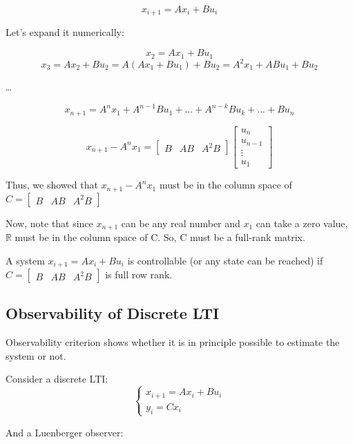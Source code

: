 \[x_{i+1} = Ax_i + Bu_i\]

Let's expand it numerically:

\[x_2 = Ax_1 + Bu_1\]
\[x_3 = Ax_2 + Bu_2 = A(Ax_1 + Bu_1) + Bu_2 = A^{2}x_1 + ABu_1 + Bu_2\]

\begin{center}
    \dots
\end{center}

\[x_{n+1} = A^{n}x_1 + A^{n-1}Bu_1 + ... + A^{n-k}Bu_k +...+ Bu_n\]


\[
x_{n+1} - A^{n}x_1 = \begin{bmatrix} B & AB & A^2B \end{bmatrix} \begin{bmatrix} u_n \\ u_{n-1} \\ \vdots \\ u_1 \end{bmatrix}
\]

Thus, we showed that $x_{n+1} - A^{n}x_1$ must be in the column space of $C = \begin{bmatrix} B & AB & A^2B \end{bmatrix}$

Now, note that since \( x_{n+1} \) can be any real number and \( x_1 \) can take a zero value, \( \mathbb{R} \) must be in the column space of C.
So, C must be a full-rank matrix. 


\begin{tcolorbox}[colback=green!10,colframe=green!50!black,title=\textbf{Controllability}]
    A system $x_{i+1} = Ax_i + Bu_i$ is controllable (or any state can be reached) if $C = \begin{bmatrix} B & AB & A^2B \end{bmatrix}$
    is full row rank.
\end{tcolorbox}


\subsection{Observability of Discrete LTI}

Observability criterion shows whether it is in principle possible to estimate the system or not. 


Consider a discrete LTI:
\[
\begin{cases}
    x_{i+1} = Ax_i + Bu_i \\
    y_i = Cx_i
\end{cases}
\]

And a Luenberger observer:


